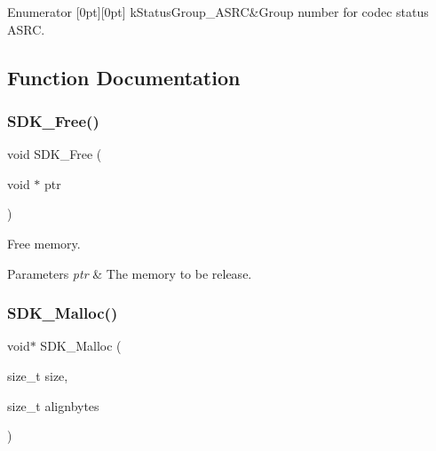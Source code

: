 \begin{DoxyEnumFields}{Enumerator}
[0pt][0pt]{}\mbox{\label{group__ksdk__common_gga7ff0b98bb1341c07acefb1473b6eda29a713723bd8764655328f1e5283a8e6020}} 
k\+Status\+Group\+\_\+\+A\+S\+RC&Group number for codec status A\+S\+RC. \\
\hline

\end{DoxyEnumFields}


\subsection{Function Documentation}
\mbox{\label{group__ksdk__common_ga0be5caec9b8493d87cc849714bd47865}} 
\subsubsection{\texorpdfstring{SDK\_Free()}{SDK\_Free()}}
{\footnotesize\ttfamily void S\+D\+K\+\_\+\+Free (\begin{DoxyParamCaption}\item[{void $\ast$}]{ptr }\end{DoxyParamCaption})}



Free memory. 


\begin{DoxyParams}{Parameters}
{\em ptr} & The memory to be release. \\
\hline
\end{DoxyParams}
\mbox{\label{group__ksdk__common_ga4e1420d9e817ebe0e8973420411de015}} 
\subsubsection{\texorpdfstring{SDK\_Malloc()}{SDK\_Malloc()}}
{\footnotesize\ttfamily void$\ast$ S\+D\+K\+\_\+\+Malloc (\begin{DoxyParamCaption}\item[{size\+\_\+t}]{size,  }\item[{size\+\_\+t}]{alignbytes }\end{DoxyParamCaption})}



